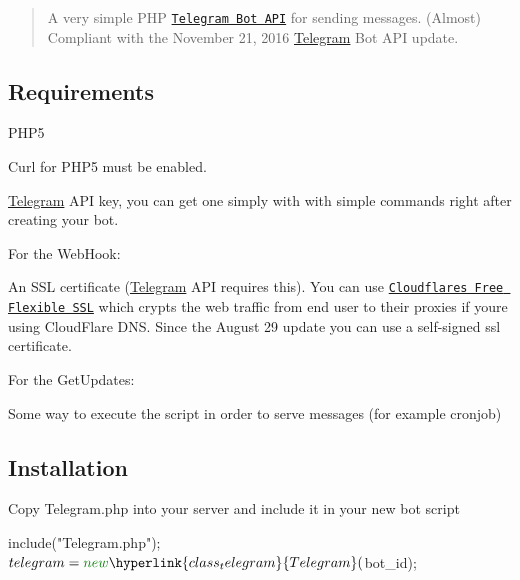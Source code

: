 \begin{quote}
A very simple P\+H\+P \href{https://core.telegram.org/bots}{\tt Telegram Bot A\+P\+I} for sending messages. (Almost) Compliant with the November 21, 2016 \hyperlink{class_telegram}{Telegram} Bot A\+P\+I update. \end{quote}


\subsection*{Requirements }


\begin{DoxyItemize}
\item P\+H\+P5
\item Curl for P\+H\+P5 must be enabled.
\item \hyperlink{class_telegram}{Telegram} A\+P\+I key, you can get one simply with \href{https://core.telegram.org/bots#botfather}{\tt } with simple commands right after creating your bot.
\end{DoxyItemize}

For the Web\+Hook\+:
\begin{DoxyItemize}
\item An S\+S\+L certificate (\hyperlink{class_telegram}{Telegram} A\+P\+I requires this). You can use \href{https://www.cloudflare.com/ssl}{\tt Cloudflare\textquotesingle{}s Free Flexible S\+S\+L} which crypts the web traffic from end user to their proxies if you\textquotesingle{}re using Cloud\+Flare D\+N\+S. Since the August 29 update you can use a self-\/signed ssl certificate.
\end{DoxyItemize}

For the Get\+Updates\+:
\begin{DoxyItemize}
\item Some way to execute the script in order to serve messages (for example cronjob)
\end{DoxyItemize}

\subsection*{Installation }


\begin{DoxyItemize}
\item Copy Telegram.\+php into your server and include it in your new bot script 
\begin{DoxyCode}
include(\textcolor{stringliteral}{"Telegram.php"});
$telegram = \textcolor{keyword}{new} \hyperlink{class_telegram}{Telegram}($bot\_id);
\end{DoxyCode}

\end{DoxyItemize}

